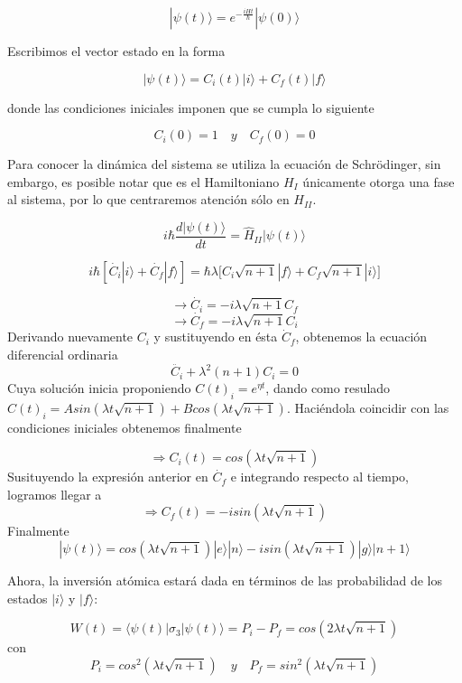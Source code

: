 \documentclass[spanish]{article}
\begin{document}
$$ |\psi(t) \rangle = e^{-\frac{iHt}{\hbar}}|\psi(0) \rangle $$



Escribimos el vector estado en la forma 

\begin{equation}
|\psi(t)\rangle = C_i(t)|i\rangle + C_f(t)|f\rangle
\end{equation}

donde las condiciones iniciales imponen que se cumpla lo siguiente

$$ C_i(0) = 1 \quad y \quad C_f(0) = 0 $$


Para conocer la dinámica del sistema se utiliza la ecuación de Schrödinger, sin embargo, es posible notar que es el Hamiltoniano $H_{I}$ únicamente otorga una fase al sistema, por lo que centraremos atención sólo en $H_{II}$.

$$ i\hbar\frac{d |\psi(t)\rangle}{dt} = \hat{H}_{II} |\psi(t)\rangle $$

$$ i\hbar[\dot{C_i}|i\rangle+\dot{C_f}|f\rangle] = \hbar\lambda \bigg[C_i\sqrt{n+1}|f\rangle+C_f\sqrt{n+1}|i\rangle\bigg]$$

$$\rightarrow \dot{C_i} = -i\lambda\sqrt{n+1}C_f$$
$$\rightarrow\dot{C_f} = -i\lambda\sqrt{n+1}C_i$$
Derivando nuevamente  $C_i$ y sustituyendo en ésta $\dot{C}_f$, obtenemos la ecuación diferencial ordinaria
$$ \ddot{C_i}+ \lambda^2(n+1)C_i=0 $$
Cuya solución inicia proponiendo $C(t)_i = e^{\eta t}$, dando como resulado $C(t)_i = Asin(\lambda t \sqrt{n+1})+Bcos(\lambda t \sqrt{n+1})$. Haciéndola coincidir con las condiciones iniciales obtenemos finalmente 

\begin{equation}
\Rightarrow C_i(t) = cos(\lambda t \sqrt{n+1})
\end{equation}
Susituyendo la expresión anterior en $\dot{C_f}$ e integrando respecto al tiempo, logramos llegar a 
\begin{equation}
\Rightarrow C_f(t) = -isin(\lambda t \sqrt{n+1})
\end{equation}
Finalmente 
\begin{equation}
|\psi(t)\rangle = cos(\lambda t \sqrt{n+1})|e\rangle|n\rangle -isin(\lambda t \sqrt{n+1})	|g\rangle|n+1\rangle
\end{equation}

Ahora, la inversión atómica estará dada en términos de las probabilidad de los estados $|i\rangle$ y $|f\rangle$:

\begin{equation}
W(t) = \langle\psi(t)|\sigma_3|\psi(t)\rangle = P_i - P_f = cos(2\lambda t \sqrt{n+1})
\end{equation} con
$$ P_i = cos^2(\lambda t \sqrt{n+1}) \quad y \quad P_f = sin^2(\lambda t \sqrt{n+1})$$
\end{document}
